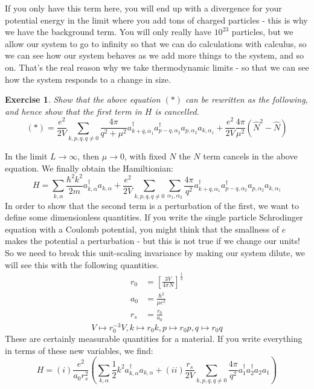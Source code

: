 \documentclass{article}
\newtheorem{exercise}{Exercise}[section]
\begin{document}
If you only have this term here, you will end up with a divergence for your potential energy in the limit where you add tons of charged particles - this is why we have the background term. You will only really have $10^{23}$ particles, but we allow our system to go to infinity so that we can do calculations with calculus, so we can see how our system behaves as we add more things to the system, and so on. That's the real reason why we take thermodynamic limits - so that we can see how the system responds to a change in size.
\begin{exercise}
    Show that the above equation $(\ast)$ can be rewritten as the following, and hence show that the first term in $H$ is cancelled.
    \[(\ast) = \frac{e^2}{2V}\sum_{k,p,q, q\neq 0} \frac{4\pi}{q^2+\mu^2}a_{k+q,\alpha_1}^\dagger a_{p-q,\alpha_2}^\dagger a_{p,\alpha_2}a_{k,\alpha_1} + \frac{e^2}{2V}\frac{4\pi}{\mu^2}(\hat N^2-\hat N)\]
\end{exercise}
In the limit $L\to \infty$, then $\mu \to 0$, with fixed $N$ the $N$ term cancels in the above equation. We finally obtain the Hamiltionian:
\begin{equation}H = \sum_{k,\alpha}\frac{\hbar^2 k^2}{2m}a_{k,\alpha}^\dagger a_{k,\alpha} + \frac{e^2}{2V} \sum_{k,p,q, q\neq 0}\sum_{\alpha_1,\alpha_2}\frac{4\pi}{q^2} a_{k+q,\alpha_1}^\dagger a_{p-q,\alpha_2}^\dagger a_{p,\alpha_2}a_{k,\alpha_1}\end{equation}
In order to show that the second term is a perturbation of the first, we want to define some dimensionless quantities. If you write the single particle Schrodinger equation with a Coulomb potential, you might think that the smallness of $e$ makes the potential a perturbation - but this is not true if we change our units! So we need to break this unit-scaling invariance by making our system dilute, we will see this with the following quantities.
\begin{align}r_0 &= \left[\frac{3V}{4\pi N}\right]^{\frac{1}{3}}\\
a_0 &= \frac{\hbar^2}{\mu e^2}\\
r_s &= \frac{r_0}{a_0}\end{align}
\[V \mapsto r_0^{-3}V, k \mapsto r_0 k, p\mapsto r_0 p, q\mapsto r_0 q \]
These are certainly measurable quantities for a material. If you write everything in terms of these new variables, we find:
\[H = (i) \frac{e^2}{a_0 r_s^2}\left(\sum_{k,\alpha}\frac{1}{2}k^2 a_{k,\alpha}^\dagger a_{k,\alpha} + (ii) \frac{r_s}{2V} \sum_{k,p,q,q\neq 0} \frac{4\pi}{q^2}a_1^\dagger a_2^\dagger a_2 a_1\right)\]
\end{document}
